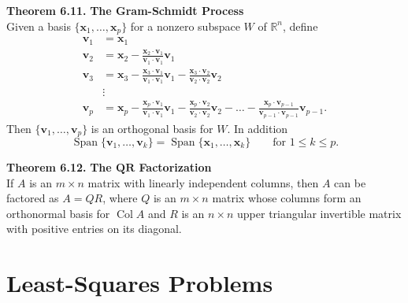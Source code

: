 \documentclass[10pt]{book}
\newenvironment{boxthm}{\begin{mdframed}[backgroundcolor=gray!30,nobreak=true]}{\end{mdframed}}
\newcommand{\R}{\mathbb{R}}
\newcommand{\vect}[1]{\ensuremath{\boldsymbol{\mathbf{#1}}}}
\DeclareMathOperator{\Span}{Span}
\DeclareMathOperator{\Col}{Col}
\newcommand{\vectset}[3][v]{\{\vect{#1}_{#2},\ldots,\vect{#1}_{#3}\}}
\newcommand{\vectsetvp}{\{\vect{v}_1,\ldots,\vect{v}_p\}}
\begin{document}
\begin{boxthm}
	\textbf{Theorem 6.11.}
	\textbf{The Gram-Schmidt Process} \\
	Given a basis $\vectset[x]{1}{p}$ for a nonzero subspace $W$ of $\R^n$, define
	\begin{align*}
	\vect{v}_1 &= \vect{x}_1 \\
	\vect{v}_2 &= \vect{x}_2 - \frac{\vect{x}_2\cdot\vect{v}_1}{\vect{v}_1\cdot\vect{v}_1}\vect{v}_1 \\
	\vect{v}_3 &= \vect{x}_3 - \frac{\vect{x}_3\cdot\vect{v}_1}{\vect{v}_1\cdot\vect{v}_1}\vect{v}_1 - \frac{\vect{x}_3\cdot\vect{v}_2}{\vect{v}_2\cdot\vect{v}_2}\vect{v}_2 \\
	&\vdots \\
	\vect{v}_p &= \vect{x}_p - \frac{\vect{x}_p\cdot\vect{v}_1}{\vect{v}_1\cdot\vect{v}_1}\vect{v}_1 - \frac{\vect{x}_p\cdot\vect{v}_2}{\vect{v}_2\cdot\vect{v}_2}\vect{v}_2 - \ldots -  \frac{\vect{x}_p\cdot\vect{v}_{p-1}}{\vect{v}_{p-1}\cdot\vect{v}_{p-1}}\vect{v}_{p-1}.
	\end{align*}
	Then $\vectsetvp$ is an orthogonal basis for $W$. In addition
	$$ \Span\vectset{1}{k} = \Span\vectset[x]{1}{k} \qquad \text{for } 1\leq k\leq p. $$
\end{boxthm}
\begin{boxthm}
	\textbf{Theorem 6.12.}
	\textbf{The $\boldsymbol{QR}$ Factorization} \\
	If $A$ is an $m\times n$ matrix with linearly independent columns, then $A$ can be factored as $A=QR$, where $Q$ is an $m\times n$ matrix whose columns form an orthonormal basis for $\Col A$ and $R$ is an $n\times n$ upper triangular invertible matrix with positive entries on its diagonal.
\end{boxthm}


\newpage


\section{Least-Squares Problems}
\end{document}

